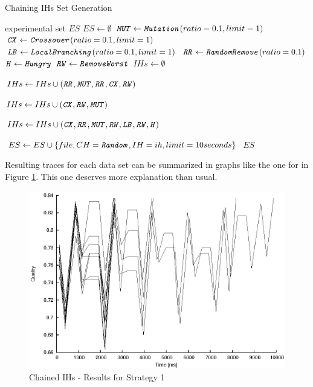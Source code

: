 \begin{algorithm}
\caption{Chaining IHs Set Generation}
\label{listing-experiment-chaining-ihs}
\begin{algorithmic}
\ENSURE experimental set $ES$
\STATE $ES \gets \emptyset$
\STATE $\texttt{\textit{MUT}} \gets \texttt{\textit{Mutation}}(ratio = 0.1, limit = 1)$
\STATE $\texttt{\textit{CX}} \gets \texttt{\textit{Crossover}}(ratio = 0.1, limit = 1)$
\STATE $\texttt{\textit{LB}} \gets \texttt{\textit{LocalBranching}}(ratio = 0.1, limit = 1)$
\STATE $\texttt{\textit{RR}} \gets \texttt{\textit{RandomRemove}}(ratio = 0.1)$
\STATE $\texttt{\textit{H}} \gets \texttt{\textit{Hungry}}$
\STATE $\texttt{\textit{RW}} \gets \texttt{\textit{RemoveWorst}}$
\STATE $IHs \gets \emptyset$

\STATE $IHs \gets IHs \cup (\texttt{\textit{RR}}, \texttt{\textit{MUT}}, \texttt{\textit{RR}}, \texttt{\textit{CX}}, \texttt{\textit{RW}})$

\STATE $IHs \gets IHs \cup (\texttt{\textit{CX}}, \texttt{\textit{RW}}, \texttt{\textit{MUT}})$

\STATE $IHs \gets IHs \cup (\texttt{\textit{CX}}, \texttt{\textit{RR}}, \texttt{\textit{MUT}}, \texttt{\textit{RW}}, \texttt{\textit{LB}}, \texttt{\textit{RW}}, \texttt{\textit{H}})$

      \STATE $ES \gets ES \cup \{file, CH = \texttt{\textit{Random}}, IH = ih, limit = 10 seconds\}$
    \ENDFOR
  \ENDFOR
\ENDFOR
\RETURN $ES$
\end{algorithmic}
\end{algorithm}

Resulting traces for each data set can be summarized in graphs like the one for  in Figure \ref{image-experiment-chained-ihs-s1}. This one deserves more explanation than usual.

\begin{figure}
  \caption{Chained IHs -  Results for Strategy 1}
  \label{image-experiment-chained-ihs-s1}
  \centering
    \includegraphics[width=\textwidth]{images/experiments/chained-ihs-s1}
\end{figure}

